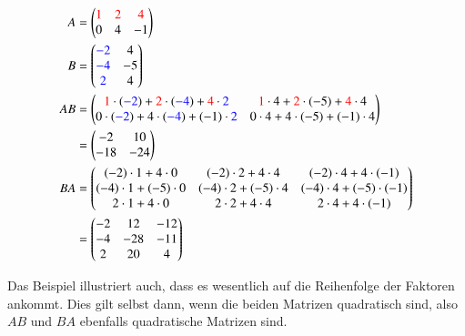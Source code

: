 \begin{beispiel}
\begin{align*}
A&=\begin{pmatrix}
\color{red}1&\color{red}2&\color{red}4\\
0&4&-1
\end{pmatrix}
\\
B&=\begin{pmatrix}
\color{blue}-2&4\\
\color{blue}-4&-5\\
\color{blue}2&4
\end{pmatrix}
\\
AB&=
\begin{pmatrix}
{\color{red}1}\cdot({\color{blue}-2})+{\color{red}2}\cdot({\color{blue}-4})+{\color{red}4}\cdot{\color{blue}2} &
{\color{red}1}\cdot 4+{\color{red}2}\cdot(-5)+{\color{red}4}\cdot 4\\
0\cdot ({\color{blue}-2})+4\cdot({\color{blue}-4})+(-1)\cdot {\color{blue}2} &
0\cdot 4+4\cdot(-5)+(-1)\cdot 4
\end{pmatrix}
\\
&=
\begin{pmatrix}
-2&10\\-18&-24
\end{pmatrix}
\\
BA&=\begin{pmatrix}
(-2)\cdot1+4\cdot 0&
(-2)\cdot2+4\cdot 4&
(-2)\cdot4+4\cdot (-1) \\
(-4)\cdot1+(-5)\cdot 0&
(-4)\cdot2+(-5)\cdot 4&
(-4)\cdot4+(-5)\cdot (-1)\\
2\cdot1+ 4\cdot0&
2\cdot2+ 4\cdot4&
2\cdot4+ 4\cdot (-1)
\end{pmatrix}
\\
&=
\begin{pmatrix}
   -2&  12& -12\\
   -4& -28& -11\\
    2&  20&   4
\end{pmatrix}
\end{align*}
\end{beispiel}
Das Beispiel illustriert auch, dass es wesentlich auf die Reihenfolge
der Faktoren ankommt.
Dies gilt selbst dann, wenn die beiden
Matrizen quadratisch sind, also $AB$ und $BA$ ebenfalls quadratische
Matrizen sind.
